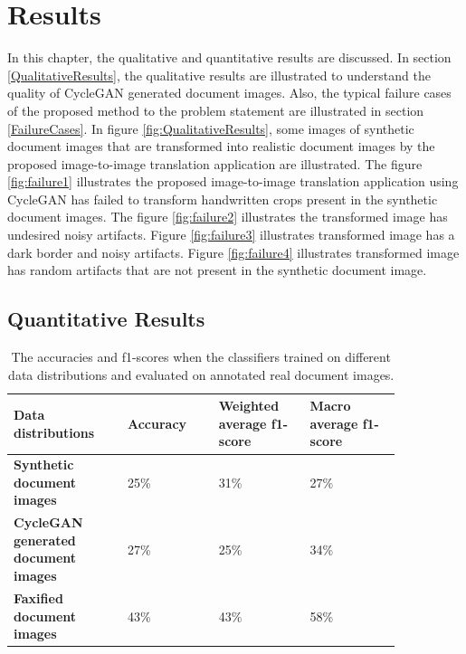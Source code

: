 \section{Results}\label{results}
In this chapter, the qualitative and quantitative results are discussed. In section \ref{QualitativeResults}, the qualitative results are illustrated to understand the quality of \ac{CycleGAN} generated document images. Also, the typical failure cases of the proposed method to the problem statement are illustrated in section \ref{FailureCases}. In figure \ref{fig:QualitativeResults}, some images of synthetic document images that are transformed into realistic document images by the proposed image-to-image translation application are illustrated. The figure \ref{fig:failure1} illustrates the proposed image-to-image translation application using \ac{CycleGAN} has failed to transform handwritten crops present in the synthetic document images. The figure \ref{fig:failure2} illustrates the transformed image has undesired noisy artifacts. Figure \ref{fig:failure3} illustrates transformed image has a dark border and noisy artifacts. Figure \ref{fig:failure4} illustrates transformed image has random artifacts that are not present in the synthetic document image.


\subsection{Quantitative Results}\label{QuantitativeResults}


\hspace*{5.0em}

\begin{table}[H]
\begin{tabular}{P{0.25\linewidth} P{0.20\linewidth} P{0.20\linewidth} P{0.20\linewidth}} 
	\toprule
	\bf{Data distributions} & \bf{Accuracy}  & \bf{Weighted average f1-score} & \bf{Macro average f1-score} \\[0.0ex] 
	\midrule
     \bf{Synthetic document images} & 25\% & 31\% & 27\%\\[0.0ex]
     \midrule
     \bf{\ac{CycleGAN} generated document images} & 27\% & 25\% & 34\%\\[0.0ex]
     \midrule
     \bf{Faxified document images} & 43\% & 43\% & 58\%\\[0.0ex]
     \bottomrule
\end{tabular}
 \caption[The accuracies and f1-scores when the classifiers trained on different data distributions and evaluated on annotated real document images.]{The accuracies and f1-scores when the classifiers trained on different data distributions and evaluated on annotated real document images.}
    \label{table:finalResults}
\end{table}


